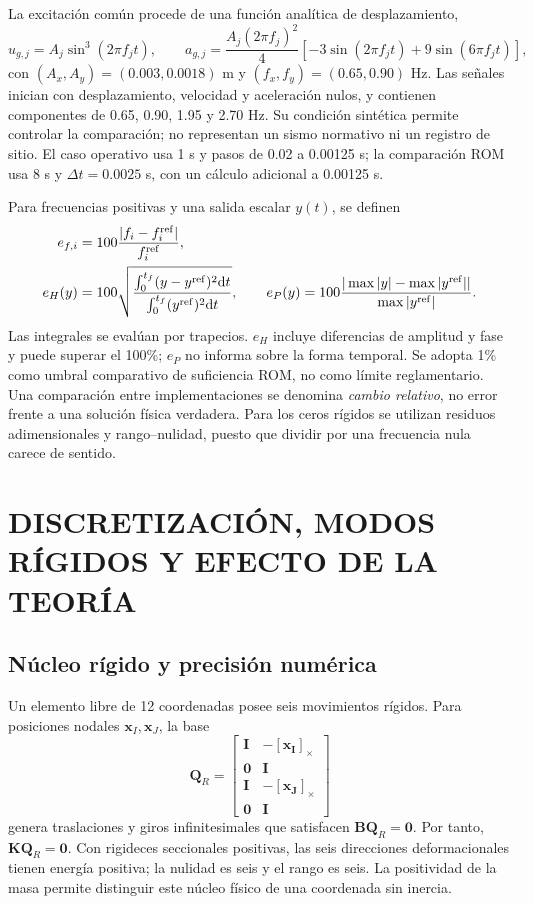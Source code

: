 \documentclass[oneside,a4paper,spanish,links,pagenumbers]{amca}
\newcommand{\Sx}[1]{[\bm{#1}]_\times}
\newcommand{\I}{\bm I}
\newcommand{\dd}{\mathrm d}
\begin{document}
La excitación común procede de una función analítica de desplazamiento,
\begin{equation}
 u_{g,j}=A_j\sin^3(2\pi f_jt),\qquad
 a_{g,j}=\frac{A_j(2\pi f_j)^2}{4}
 [-3\sin(2\pi f_jt)+9\sin(6\pi f_jt)],
 \label{eq:entrada}
\end{equation}
con $(A_x,A_y)=(0.003,0.0018)$ m y $(f_x,f_y)=(0.65,0.90)$ Hz. Las señales inician con desplazamiento, velocidad y aceleración nulos, y contienen componentes de 0.65, 0.90, 1.95 y 2.70 Hz. Su condición sintética permite controlar la comparación; no representan un sismo normativo ni un registro de sitio. El caso operativo usa 1 s y pasos de 0.02 a 0.00125 s; la comparación ROM usa 8 s y $\Delta t=0.0025$ s, con un cálculo adicional a 0.00125 s.

Para frecuencias positivas y una salida escalar $y(t)$, se definen
\begin{align}
 e_{f,i}&=100\frac{|f_i-f_i^{\rm ref}|}{f_i^{\rm ref}},\\
 e_H(y)&=100\sqrt{\frac{\int_0^{t_f}(y-y^{\rm ref})^2\dd t}
 {\int_0^{t_f}(y^{\rm ref})^2\dd t}},\qquad
 e_P(y)=100\frac{|\max|y|-\max|y^{\rm ref}||}{\max|y^{\rm ref}|}.
 \label{eq:errores}
\end{align}
Las integrales se evalúan por trapecios. $e_H$ incluye diferencias de amplitud y fase y puede superar el 100\%; $e_P$ no informa sobre la forma temporal. Se adopta 1\% como umbral comparativo de suficiencia ROM, no como límite reglamentario. Una comparación entre implementaciones se denomina \emph{cambio relativo}, no error frente a una solución física verdadera. Para los ceros rígidos se utilizan residuos adimensionales y rango--nulidad, puesto que dividir por una frecuencia nula carece de sentido.

\section{DISCRETIZACIÓN, MODOS RÍGIDOS Y EFECTO DE LA TEORÍA}
\label{sec:discretizacion}
\subsection{Núcleo rígido y precisión numérica}
Un elemento libre de 12 coordenadas posee seis movimientos rígidos. Para posiciones nodales $\bm x_I,\bm x_J$, la base
\begin{equation}
 \bm Q_R=\begin{bmatrix}
 \I&-\Sx{x_I}\\\bm0&\I\\\I&-\Sx{x_J}\\\bm0&\I
 \end{bmatrix}
 \label{eq:rigidos}
\end{equation}
genera traslaciones y giros infinitesimales que satisfacen $\bm B\bm Q_R=\bm0$. Por tanto, $\bm K\bm Q_R=\bm0$. Con rigideces seccionales positivas, las seis direcciones deformacionales tienen energía positiva; la nulidad es seis y el rango es seis. La positividad de la masa permite distinguir este núcleo físico de una coordenada sin inercia.
\end{document}
